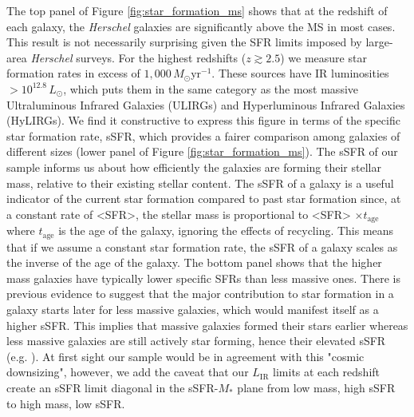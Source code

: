 The top panel of Figure \ref{fig:star_formation_ms} shows that at the redshift of each galaxy, the \textit{Herschel} galaxies are significantly above the MS in most cases. This result is not necessarily surprising given the SFR limits imposed by large-area \textit{Herschel} surveys. For the highest redshifts ($z \gtrsim 2.5$) we measure star formation rates in excess of $1,000\,M_\odot$yr$^{-1}$. These sources have IR luminosities $> 10^{12.8}\,L_\odot$, which puts them in the same category as the most massive Ultraluminous Infrared Galaxies (ULIRGs) and Hyperluminous Infrared Galaxies (HyLIRGs). We find it constructive to express this figure in terms of the specific star formation rate, sSFR, which provides a fairer comparison among galaxies of different sizes (lower panel of Figure \ref{fig:star_formation_ms}). The sSFR of our sample informs us about how efficiently the galaxies are forming their stellar mass, relative to their existing stellar content. The sSFR of a galaxy is a useful indicator of the current star formation compared to past star formation since, at a constant rate of <SFR>, the stellar mass is proportional to <SFR> $\times t_{\textrm{age}}$ where $t_{\textrm{age}}$ is the age of the galaxy, ignoring the effects of recycling. This means that if we assume a constant star formation rate, the sSFR of a galaxy scales as the inverse of the age of the galaxy. The bottom panel shows that the higher mass galaxies have typically lower specific SFRs than less massive ones. There is previous evidence to suggest that the major contribution to star formation in a galaxy starts later for less massive galaxies, which would manifest itself as a higher sSFR. This implies that massive galaxies formed their stars earlier whereas less massive galaxies are still actively star forming, hence their elevated sSFR (e.g. \citealt{Brinchmann_2000, Juneau_2005, Bell_2005, Caputi_2006, Reddy_2006, Noeske_2007}). At first sight our sample would be in agreement with this "cosmic downsizing", however, we add the caveat that our $L_{\textrm{IR}}$ limits at each redshift create an sSFR limit diagonal in the sSFR-$M_*$ plane from low mass, high sSFR to high mass, low sSFR.


